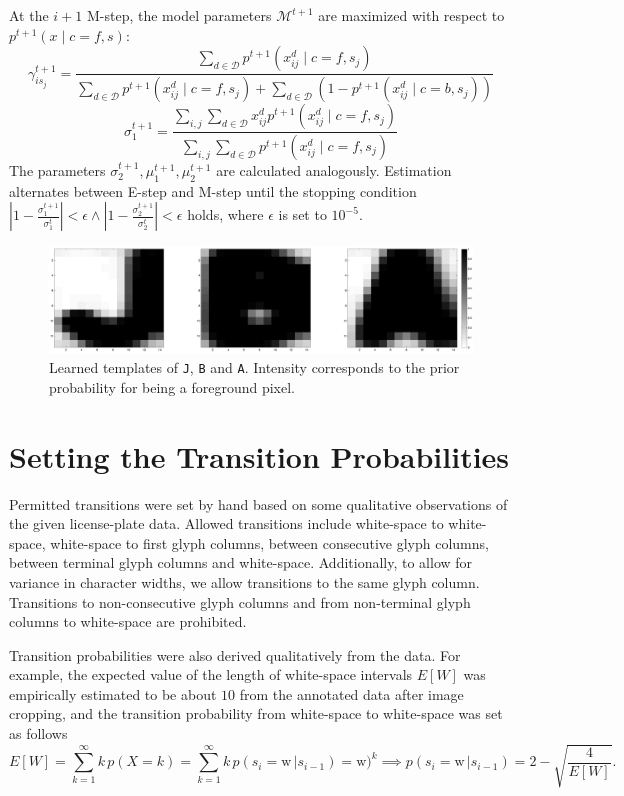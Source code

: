 \documentclass[a4paper,12pt]{article}
\newcommand{\model}{\ensuremath{\mathcal{M}}}
\begin{document}
At the $i+1$ M-step, the model parameters $\model^{t+1}$ are
maximized with respect to $p^{t+1}(x \mid c=f, s)$:
\[
  \gamma_{is_j}^{t+1} = \frac{\sum_{d \in \mathcal{D}} p^{t+1}(x^d_{ij} \mid
    c=f, s_j)}{\sum_{d \in \mathcal{D}} p^{t+1}(x^d_{ij} \mid c=f,
    s_j) + \sum_{d \in \mathcal{D}} (1-p^{t+1}(x^d_{ij} \mid c=b,
    s_j))}
\]
\[
  \sigma_1^{t+1} = \frac{\sum_{i,j} \sum_{d \in \mathcal{D}} x^d_{
      ij} p^{t+1}(x^d_{ij} \mid c=f, s_j)}{\sum_{i,j} \sum_{d \in
      \mathcal{D}} p^{t+1}(x^d_{ij} \mid c=f, s_j)}
\]
The parameters $\sigma_2^{t+1}, \mu_1^{t+1}, \mu_2^{t+1}$ are
calculated analogously. Estimation alternates between E-step and
M-step until the stopping condition
$|1-\frac{\sigma_1^{t+1}}{\sigma_1^{t}}| < \epsilon \wedge
|1-\frac{\sigma_2^{t+1}}{\sigma_2^{t}}| < \epsilon$ holds, where
$\epsilon$ is set to $10^{-5}$.

\begin{figure}[htp]
\centering
\includegraphics[width=\linewidth]{pics/jba.png}
\caption{Learned templates of \texttt{J}, \texttt{B} and
  \texttt{A}. Intensity corresponds to the prior probability for being
  a foreground pixel.}
\label{fig:templates}
\end{figure}

\section{Setting the Transition Probabilities}
Permitted transitions were set by hand based on some qualitative
observations of the given license-plate data. Allowed transitions
include white-space to white-space, white-space to first glyph
columns, between consecutive glyph columns, between terminal glyph
columns and white-space. Additionally, to allow for variance in
character widths, we allow transitions to the same glyph
column. Transitions to non-consecutive glyph columns and from
non-terminal glyph columns to white-space are prohibited.

Transition probabilities were also derived qualitatively from the
data. For example, the expected value of the length of white-space
intervals $E[W]$ was empirically estimated to be about $10$ from the
annotated data after image cropping, and the transition probability
from white-space to white-space was set as follows 
\[ 
E[W] = \sum_{k=1}^\infty k\,p(X=k) = \sum_{k=1}^\infty k
\,p(s_i=\text{w} \,| s_{i-1})=\text{w})^k \implies p(s_i=\text{w} \,|
s_{i-1}) = 2-\sqrt{\frac{4}{E[W]}}.
\]
\end{document}
